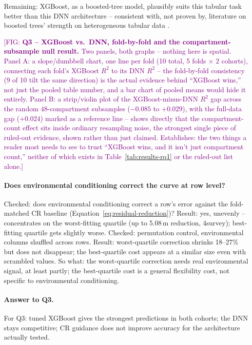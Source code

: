 \documentclass[logo,msc,ai]{infthesis}           %
\newcommand{\fig}[1]{\textcolor{purple}{[FIG: #1]}}
\begin{document}
Remaining: XGBoost, as a boosted-tree model, plausibly suits this tabular task
better than this DNN architecture -- consistent with, not proven by, literature
on boosted trees' strength on heterogeneous tabular data
\cite{shwartzziv2021Tabular_C4_NN}.

\fig{\textbf{Q3 -- XGBoost vs.\ DNN, fold-by-fold and the compartment-subsample
null result.} Two panels, both graphs -- nothing here is spatial. Panel A: a
slope/dumbbell chart, one line per fold (10 total, 5 folds $\times$ 2 cohorts),
connecting each fold's XGBoost $R^2$ to its DNN $R^2$ -- the fold-by-fold
consistency (9 of 10 tilt the same direction) is the actual evidence behind
``XGBoost wins,'' not just the pooled table number, and a bar chart of pooled
means would hide it entirely. Panel B: a strip/violin plot of the
XGBoost-minus-DNN $R^2$ gap across the random 48-compartment subsamples
($-0.085$ to $+0.029$), with the full-data gap ($+0.024$) marked as a
reference line -- shows directly that the compartment-count effect sits inside
ordinary resampling noise, the strongest single piece of ruled-out evidence,
shown rather than just claimed. Establishes: the two things a reader most
needs to see to trust ``XGBoost wins, and it isn't just compartment count,''
neither of which exists in Table~\ref{tab:results-rq1} or the ruled-out list
alone.}

\paragraph*{Does environmental conditioning correct the curve at row level?}
Checked: does environmental conditioning correct a row's error against the
fold-matched CR baseline (Equation~\ref{eq:residual-reduction})?
Result: yes, unevenly -- concentrates on the worst-fitting quartile (up to
5.08\,m reduction, 4survey); best-fitting quartile gets slightly worse.
Checked: permutation control, environmental columns shuffled across rows.
Result: worst-quartile correction shrinks 18--27\% but does not disappear; the
best-quartile cost appears at a similar size even with scrambled values.
So what: the worst-quartile correction needs real environmental signal, at
least partly; the best-quartile cost is a general flexibility cost, not
specific to environmental conditioning.

\paragraph*{Answer to Q3.}
For Q3: tuned XGBoost gives the strongest predictions in both cohorts; the DNN
stays competitive; CR guidance does not improve accuracy for the architecture
actually tested.
\end{document}
